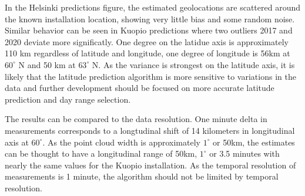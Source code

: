 \noindent In the Helsinki predictions figure, the estimated geolocations are scattered around the known installation location, showing very little bias and some random noise. Similar behavior can be seen in Kuopio predictions where two outliers 2017 and 2020 deviate more significatly. One degree on the latidue axis is approximately 110 km regardless of latitude and longitude, one degree of longitude is 56km at $60^\circ$ N and 50 km at $63^\circ$ N. As the variance is strongest on the latitude axis, it is likely that the latitude prediction algorithm is more sensitive to variations in the data and further development should be focused on more accurate latitude prediction and day range selection.


The results can be compared to the data resolution. One minute delta in measurements corresponds to a longtudinal shift of 14 kilometers in longitudinal axis at $60^\circ$. As the point cloud width is approximately $1^\circ$ or 50km, the estimates can be thought to have a longitudinal range of 50km, $1^\circ$ or 3.5 minutes with nearly the same values for the Kuopio installation. As the temporal resolution of measurements is 1 minute, the algorithm should not be limited by temporal resolution.